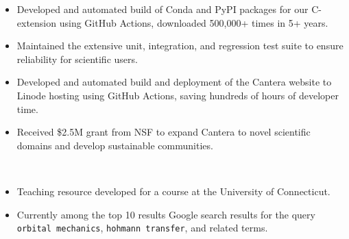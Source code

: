 \begin{itemize}
\item Developed and automated build of Conda and PyPI packages for our C-extension using GitHub Actions, downloaded 500,000+ times in 5+ years.
\item Maintained the extensive unit, integration, and regression test suite to ensure reliability for scientific users.
\item Developed and automated build and deployment of the Cantera website to Linode hosting using GitHub Actions, saving hundreds of hours of developer time.
\item Received \$2.5M grant from NSF to expand Cantera to novel scientific domains and develop sustainable communities.
\end{itemize}
\sectionsep

\\
\begin{itemize}
\item Teaching resource developed for a course at the University of Connecticut.
\item Currently among the top 10 results Google search results for the query \verb|orbital mechanics|, \verb|hohmann transfer|, and related terms.
\end{itemize}
\sectionsep

